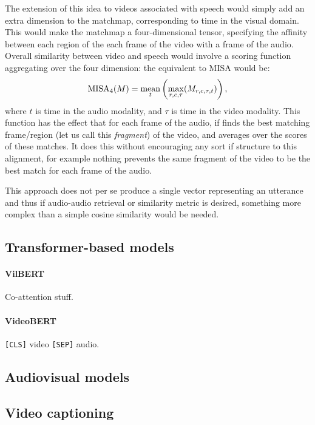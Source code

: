 The extension of this idea to videos associated with speech would
simply add an extra dimension to the matchmap, corresponding to time
in the visual domain. This would make the matchmap a four-dimensional
tensor, specifying the affinity between each region of the each frame
of the video with a frame of the audio. Overall similarity between
video and speech would involve a scoring function aggregating over
the four dimension: the equivalent to MISA would be:
\begin{equation}
  \label{eq:misa4}
  \mathrm{MISA}_4(M) = \operatorname*{mean}_t \left(\max_{r,c,\tau}(M_{r,c,\tau,t})\right),
\end{equation}
where $t$ is time in the audio modality, and $\tau$ is time in the
video modality. This function has the effect that for each frame of
the audio, if finds the best matching frame/region (let us call this
{\it fragment}) of the video, and averages over the scores of these
matches. It does this without encouraging any sort if structure to
this alignment, for example nothing prevents the same fragment of the
video to be the best match for each frame of the audio.

This approach does not per se produce a single vector representing an
utterance and thus if audio-audio retrieval or similarity metric is
desired, something more complex than a simple cosine similarity would
be needed.

\subsection{Transformer-based models}

\paragraph{VilBERT}
Co-attention stuff.

\paragraph{VideoBERT}
\texttt{[CLS]} video \texttt{[SEP]} audio.


\subsection{Audiovisual models}
\citet{aytar2016soundnet,owens2016visually,owens2016ambient}
\subsection{Video captioning}
\citet{krishna2017dense,zhou2018end}